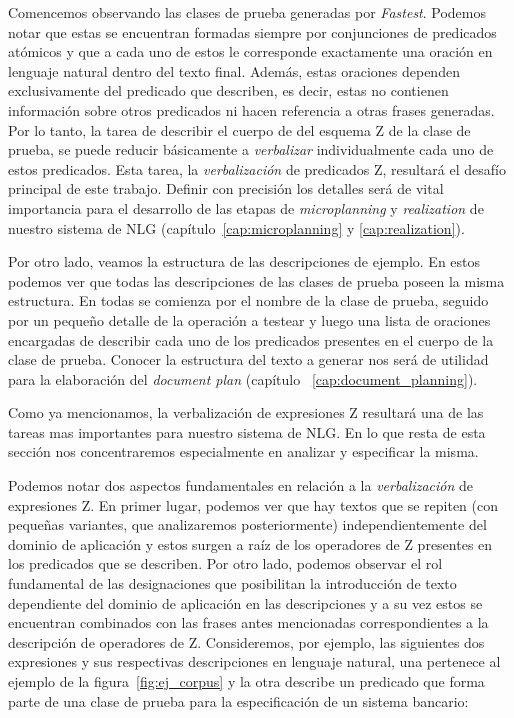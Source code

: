 Comencemos observando las clases de prueba generadas por \emph{Fastest}. Podemos notar que estas se encuentran formadas siempre por conjunciones de predicados atómicos y que a cada uno de estos le corresponde exactamente una oración en lenguaje natural dentro del texto final. Además, estas oraciones dependen exclusivamente del predicado que describen, es decir, estas no contienen información sobre otros predicados ni hacen referencia a otras frases generadas. Por lo tanto, la tarea de describir el cuerpo de del esquema Z de la clase de prueba, se puede reducir básicamente a \emph{verbalizar} individualmente cada uno de estos predicados. Esta tarea, la \emph{verbalización} de predicados Z, resultará el desafío principal de este trabajo. Definir con precisión los detalles será de vital importancia para el desarrollo de las etapas de \emph{microplanning} y \emph{realization} de nuestro sistema de NLG (capítulo~\ref{cap:microplanning} y \ref{cap:realization}).

Por otro lado, veamos la estructura de las descripciones de ejemplo. En estos podemos ver que todas las descripciones de las clases de prueba poseen la misma estructura. En todas se comienza por el nombre de la clase de prueba, seguido por un pequeño detalle de la operación a testear y luego una lista de oraciones encargadas de describir cada uno de los predicados presentes en el cuerpo de la clase de prueba. Conocer la estructura del texto a generar nos será de utilidad para la elaboración del \emph{document plan} (capítulo ~\ref{cap:document_planning}).

Como ya mencionamos, la verbalización de expresiones Z resultará una de las tareas mas importantes para nuestro sistema de NLG. En lo que resta de esta sección nos concentraremos especialmente en analizar y especificar la misma.

Podemos notar dos aspectos fundamentales en relación a la \emph{verbalización} de expresiones Z. En primer lugar, podemos ver que hay textos que se repiten (con pequeñas variantes, que analizaremos posteriormente) independientemente del dominio de aplicación y estos surgen a raíz de los operadores de Z presentes en los predicados que se describen. Por otro lado, podemos observar el rol fundamental de las designaciones que posibilitan la introducción de texto dependiente del dominio de aplicación en las descripciones y a su vez estos se encuentran combinados con las frases antes mencionadas correspondientes a la descripción de operadores de Z. Consideremos, por ejemplo, las siguientes dos expresiones y sus respectivas descripciones en lenguaje natural, una pertenece al ejemplo de la figura~\ref{fig:ej_corpus} y la otra describe un predicado que forma parte de una clase de prueba para la especificación de un sistema bancario:

